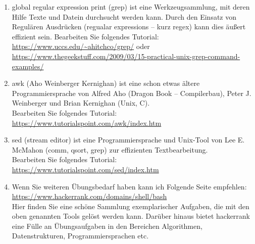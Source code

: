 \documentclass[paper=a4,fontsize=11pt]{scrartcl}%
\numberwithin{equation}{section}
\begin{document}
\begin{enumerate}
	\item global regular expression print (grep) ist eine Werkzeugsammlung, mit deren Hilfe Texte und Datein durchsucht werden kann. Durch den Einsatz von Regulären Ausdrücken (regualar expressions -- kurz regex) kann dies äußert effizient sein. Bearbeiten Sie folgendes Tutorial: \url{https://www.uccs.edu/~ahitchco/grep/} oder\\
	\url{https://www.thegeekstuff.com/2009/03/15-practical-unix-grep-command-examples/}
	\item awk (Aho Weinberger Kernighan) ist eine schon etwas ältere Programmiersprache von Alfred Aho (Dragon Book -- Compilerbau), Peter J. Weinberger und Brian Kernighan (Unix, C).\\
	Bearbeiten Sie folgendes Tutorial: \url{https://www.tutorialspoint.com/awk/index.htm}
	\item sed (stream editor) ist eine Programmiersprache und Unix-Tool von Lee E. McMahon (comm, qsort, grep) zur effizienten Textbearbeitung.\\
	Bearbeiten Sie folgendes Tutorial: \url{https://www.tutorialspoint.com/sed/index.htm}
	\item Wenn Sie weiteren Übungsbedarf haben kann ich Folgende Seite empfehlen:\\
	\url{https://www.hackerrank.com/domains/shell/bash}\\
	Hier finden Sie eine schöne Sammlung exemplarischer Aufgaben, die mit den oben genannten Tools gelöst werden kann. Darüber hinaus bietet hackerrank eine Fülle an Übungsaufgaben in den Bereichen Algorithmen, Datenstrukturen, Programmiersprachen etc.
\end{enumerate} 
\end{document}
